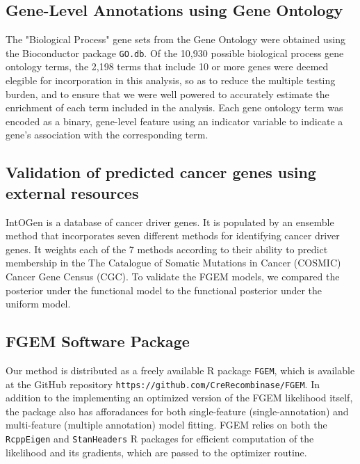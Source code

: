 \subsection{Gene-Level Annotations using Gene Ontology}\label{sec:orgd117550}

The "Biological Process" gene sets from the Gene Ontology were obtained using the Bioconductor package \texttt{GO.db}\cite{godb}. Of the 10,930 possible biological process gene ontology terms, the 2,198 terms that 
include 10 or more genes were deemed elegible for incorporation in this analysis, so as to reduce the multiple testing burden, and to ensure that we were well powered to accurately estimate the enrichment of each term included in the analysis.  Each gene ontology term was encoded as a binary, gene-level feature using an indicator variable to indicate a gene's association with the corresponding term. 

\subsection{Validation of predicted cancer genes using external resources}\label{sec:orgd8b4e10}

IntOGen is a database of cancer driver genes\cite{gonzalez-perez13_intog_mutat_ident_cancer_driver}.  It is populated by an ensemble method that incorporates seven different methods for identifying cancer driver genes.  
It weights each of the 7 methods according to their ability to predict membership in the The Catalogue of Somatic Mutations in Cancer (COSMIC) Cancer Gene Census (CGC)\cite{COSMIC}.
To validate the FGEM models, we compared the posterior under the functional model to the functional posterior under the uniform model.

\subsection{FGEM Software Package}\label{sec:org56b3320}

Our method is distributed as a freely available R package\cite{Rlang} \texttt{FGEM}, which is available at the 
GitHub repository \texttt{https://github.com/CreRecombinase/FGEM}.  In addition to the implementing an optimized version of the FGEM
likelihood itself, the package also has afforadances for both
single-feature (single-annotation) and multi-feature (multiple annotation) model fitting.  FGEM relies on both the \texttt{RcppEigen}\cite{RcppEigen} and  \texttt{StanHeaders} R
packages for efficient computation of the likelihood and its gradients, which are passed to the optimizer routine.  

